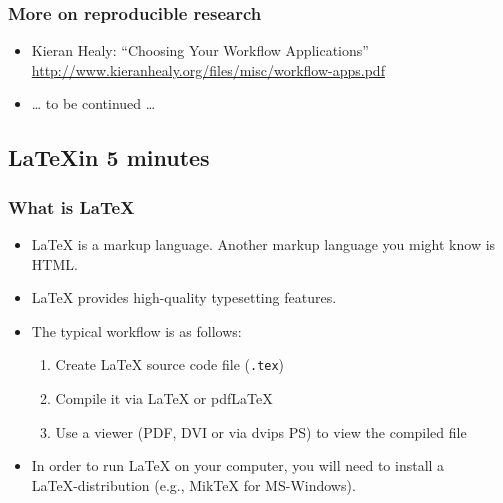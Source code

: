 \documentclass[bigger]{beamer}
\begin{document}
\begin{frame}
\frametitle{More on reproducible research}
\label{sec-7-1-5}

\begin{itemize}
\item Kieran Healy: \enquote{Choosing Your Workflow Applications}  \href{http://www.kieranhealy.org/files/misc/workflow-apps.pdf}{http://www.kieranhealy.org/files/misc/workflow-apps.pdf}
\item \ldots{} to be continued \ldots{}
\end{itemize}
\end{frame}
\subsection{\LaTeX in 5 minutes}
\label{sec-7-2}
\begin{frame}
\frametitle{What is \LaTeX}
\label{sec-7-2-1}
\begin{itemize}

\item \LaTeX{} is a markup language. Another markup language you might know is HTML.
\label{sec-7-2-1-1}%

\item \LaTeX{} provides high-quality typesetting features.
\label{sec-7-2-1-2}%

\item The typical workflow is as follows:
\label{sec-7-2-1-3}%
\begin{enumerate}
\item Create \LaTeX{} source code file (\texttt{.tex})
\item Compile it via \LaTeX{} or pdf\LaTeX
\item Use a viewer (PDF, DVI or via dvips PS) to view the compiled file
\end{enumerate}

\item In order to run \LaTeX{} on your computer, you will need to install a\\
\label{sec-7-2-1-4}%
\LaTeX-distribution (e.g., Mik\TeX{} for MS-Windows).  


\end{itemize} %
\end{frame}
\end{document}
